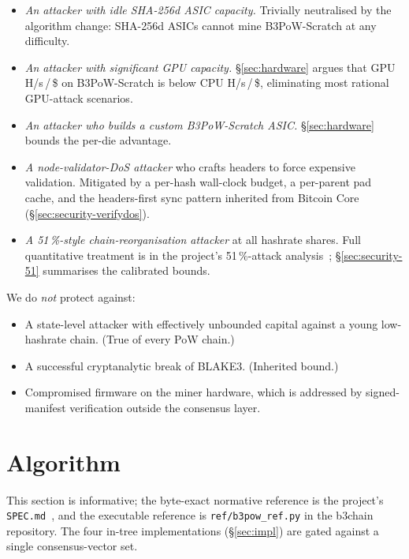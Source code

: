 \documentclass[11pt,a4paper]{article}
\theoremstyle{plain}
\theoremstyle{definition}
\theoremstyle{remark}
\begin{document}
\begin{itemize}\itemsep0.2em
\item \emph{An attacker with idle SHA-256d ASIC capacity.} Trivially
      neutralised by the algorithm change: SHA-256d ASICs cannot
      mine B3PoW-Scratch at any difficulty.
\item \emph{An attacker with significant GPU capacity.}
      \S\ref{sec:hardware} argues that GPU H/s\,/\,\$ on
      B3PoW-Scratch is below CPU H/s\,/\,\$, eliminating most
      rational GPU-attack scenarios.
\item \emph{An attacker who builds a custom B3PoW-Scratch ASIC.}
      \S\ref{sec:hardware} bounds the per-die advantage.
\item \emph{A node-validator-DoS attacker} who crafts headers to
      force expensive validation. Mitigated by a per-hash wall-clock
      budget, a per-parent pad cache, and the headers-first sync
      pattern inherited from Bitcoin Core
      (\S\ref{sec:security-verifydos}).
\item \emph{A 51\,\%-style chain-reorganisation attacker} at all
      hashrate shares. Full quantitative treatment is in the
      project's 51\,\%-attack analysis~\cite{b3chain-51attack};
      \S\ref{sec:security-51} summarises the calibrated bounds.
\end{itemize}

We do \emph{not} protect against:

\begin{itemize}\itemsep0.2em
\item A state-level attacker with effectively unbounded capital
      against a young low-hashrate chain. (True of every PoW chain.)
\item A successful cryptanalytic break of BLAKE3. (Inherited
      bound.)
\item Compromised firmware on the miner hardware, which is
      addressed by signed-manifest verification outside the
      consensus layer.
\end{itemize}

\section{Algorithm}\label{sec:algorithm}

This section is informative; the byte-exact normative
reference is the project's \texttt{SPEC.md}~\cite{b3chain-spec}, and
the executable reference is \texttt{ref/b3pow\_ref.py} in the
b3chain repository. The four in-tree implementations
(\S\ref{sec:impl}) are gated against a single consensus-vector set.
\end{document}
